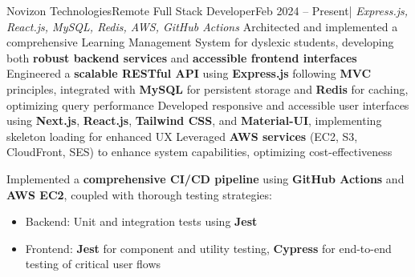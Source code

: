 
\resumeSubheading
  {Novizon Technologies}{Remote}
  {Full Stack Developer}{Feb 2024 -- Present}{| \textit{Express.js, React.js, MySQL, Redis, AWS, GitHub Actions}}
  \resumeItemListStart
    {Architected and implemented a comprehensive Learning Management System for dyslexic students, developing both \textbf{robust backend services} and \textbf{accessible frontend interfaces}}
    {Engineered a \textbf{scalable RESTful API} using \textbf{Express.js} following \textbf{MVC} principles, integrated with \textbf{MySQL} for persistent storage and \textbf{Redis} for caching, optimizing query performance}
    {Developed responsive and accessible user interfaces using \textbf{Next.js}, \textbf{React.js}, \textbf{Tailwind CSS}, and \textbf{Material-UI}, implementing skeleton loading for enhanced UX}
    {Leveraged \textbf{AWS services} (EC2, S3, CloudFront, SES) to enhance system capabilities, optimizing cost-effectiveness}
    {Implemented a \textbf{comprehensive CI/CD pipeline} using \textbf{GitHub Actions} and \textbf{AWS EC2}, coupled with thorough testing strategies:
    \begin{itemize}
      \item Backend: Unit and integration tests using \textbf{Jest}
      \item Frontend: \textbf{Jest} for component and utility testing, \textbf{Cypress} for end-to-end testing of critical user flows
    \end{itemize}}
  \resumeItemListEnd
 